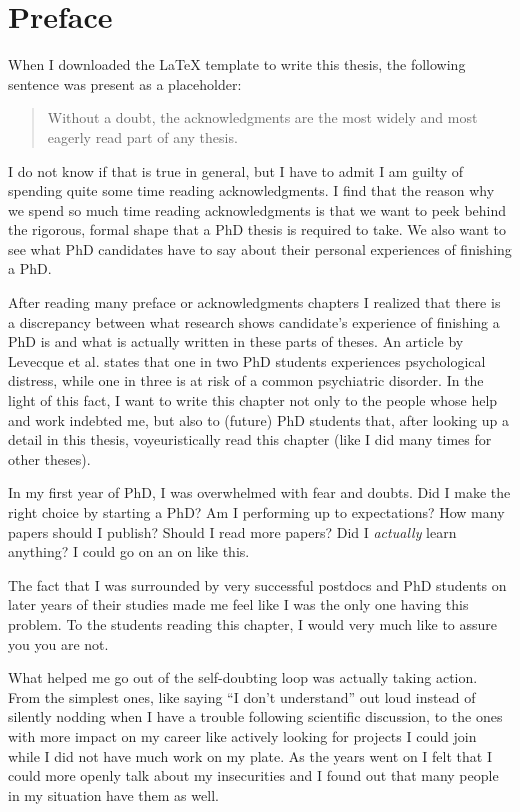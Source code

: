 \chapter*{Preface}

When I downloaded the \LaTeX{} template to write this thesis, the following
sentence was present as a placeholder:
\begin{quote}
    Without a doubt, the acknowledgments are the most widely and most eagerly
    read part of any thesis.
\end{quote}

I do not know if that is true in general, but I have to admit I am guilty of
spending quite some time reading acknowledgments. I find that the reason why we
spend so much time reading acknowledgments is that we want to peek behind the
rigorous, formal shape that a PhD thesis is required to take. We also want to
see what PhD candidates have to say about their personal experiences of
finishing a PhD.

After reading many preface or acknowledgments chapters I realized that there
is a discrepancy between what research shows candidate's experience of finishing
a PhD is and what is actually written in these parts of theses. An
article by Levecque et al. \cite{labhg-17-phdstudents} states that one in two
PhD students experiences psychological distress, while one in three is at risk
of a common psychiatric disorder. In the light of this fact, I want to write
this chapter not only to the people whose help and work indebted me, but also to
(future) PhD students that, after looking up a detail in this thesis,
voyeuristically read this chapter (like I did many times for other theses).

In my first year of PhD, I was overwhelmed with fear and doubts. Did I make the
right choice by starting a PhD? Am I performing up to expectations? How many
papers should I publish? Should I read more papers? Did I \emph{actually} learn
anything? I could go on an on like this.

The fact that I was surrounded by very successful postdocs and PhD students on
later years of their studies made me feel like I was the only one having this
problem. To the students reading this chapter, I would very much like to assure
you you are not. 

What helped me go out of the self-doubting loop was actually taking action. From
the simplest ones, like saying ``I don't understand'' out loud instead of
silently nodding when I have a trouble following scientific discussion, to the
ones with more impact on my career like actively looking for projects I could
join while I did not have much work on my plate. As the years went on I felt
that I could more openly talk about my insecurities and I found out that many
people in my situation have them as well.

